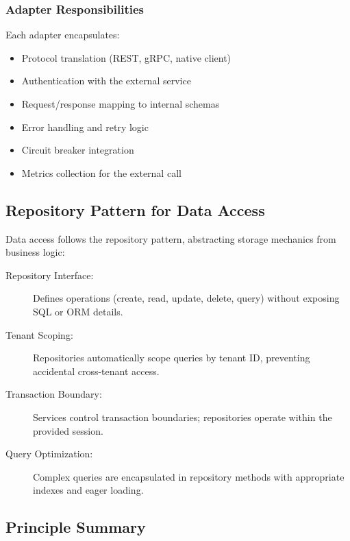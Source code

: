 \documentclass[a4paper,twoside]{sapthesis}
\begin{document}
\subsubsection{Adapter Responsibilities}

Each adapter encapsulates:
\begin{itemize}
    \item Protocol translation (REST, gRPC, native client)
    \item Authentication with the external service
    \item Request/response mapping to internal schemas
    \item Error handling and retry logic
    \item Circuit breaker integration
    \item Metrics collection for the external call
\end{itemize}

\subsection{Repository Pattern for Data Access}
\label{subsec:repository-pattern}

Data access follows the repository pattern, abstracting storage mechanics from business logic:

\begin{description}
    \item[Repository Interface:] Defines operations (create, read, update, delete, query) without exposing SQL or ORM details.
    
    \item[Tenant Scoping:] Repositories automatically scope queries by tenant ID, preventing accidental cross-tenant access.
    
    \item[Transaction Boundary:] Services control transaction boundaries; repositories operate within the provided session.
    
    \item[Query Optimization:] Complex queries are encapsulated in repository methods with appropriate indexes and eager loading.
\end{description}

\subsection{Principle Summary}
\label{subsec:principle-summary}
\end{document}
